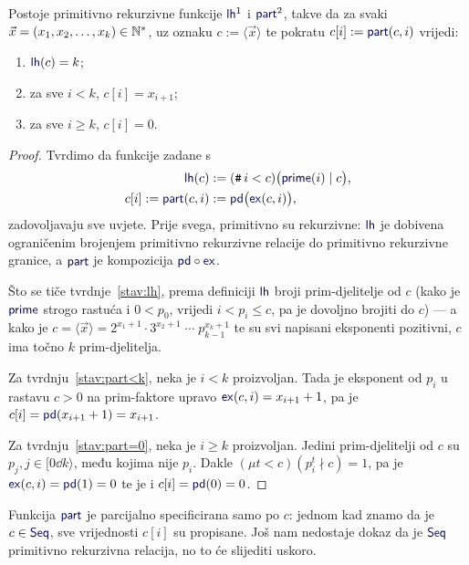 \begin{propozicija}[{name=[primitivna rekurzivnost dekodiranja konačnih nizova]}]\label{prop:lhpartprn}
Postoje primitivno rekurzivne funkcije $\f{lh}^1$ i $\f{part}^2$, takve da za svaki $\vec x=(x_1,x_2,\dotsc,x_k)\in{\mathbb N}^*$, uz oznaku $c:=\langle\vec x\rangle$ te pokratu $c[i]:=\f{part}(c,i)$ vrijedi:
\begin{enumerate}
    \item\label{stav:lh} $\f{lh}(c)=k$;
    \item\label{stav:part<k} za sve $i<k$, $c[i]=x_{i+1}$;
    \item\label{stav:part=0} za sve $i\ge k$, $c[i]=0$.
\end{enumerate}
\end{propozicija}
\begin{proof}
Tvrdimo da funkcije zadane s
\begin{align}
\f{lh}(c)&:=(\num i<c)\bigl(\f{prime}(i)\mid c\bigr)\text,\\
c[i]:=\f{part}(c,i)&:=\f{pd}\bigl(\f{ex}(c,i)\bigr)\text,
\end{align}
zadovoljavaju sve uvjete. Prije svega, primitivno su rekurzivne: $\f{lh}$ je dobivena og\-ra\-ni\-če\-nim brojenjem primitivno rekurzivne relacije do primitivno rekurzivne granice, a $\f{part}$ je kompozicija $\f{pd}\circ\f{ex}$.

    Što se tiče tvrdnje~\ref{stav:lh}, prema definiciji $\f{lh}$ broji prim-djelitelje od $c$ (kako je $\f{prime}$ strogo rastuća i $0<p_0$, vrijedi $i<p_i\le c$, pa je dovoljno brojiti do $c$) --- a kako je $c=\langle\vec x\rangle=2^{x_1+1}\cdot3^{x_2+1}\mathbin{\dotsm}p_{k-1}^{x_k+1}$ te su svi napisani eksponenti pozitivni, $c$ ima točno $k$ prim-djelitelja.

Za tvrdnju~\ref{stav:part<k}, neka je $i<k$ proizvoljan. Tada je eksponent od $p_i$ u rastavu $c>0$ na prim-faktore upravo $\f{ex}(c,i)=x_{i+1}+1$, pa je $c[i]=\f{pd}(x_{i+1}+1)=x_{i+1}$.

    Za tvrdnju~\ref{stav:part=0}, neka je $i\ge k$ proizvoljan. Jedini prim-djelitelji od $c$ su $p_j,j\in[0\dd k\rangle$, među kojima nije $p_i$. Dakle $(\mu t<c)(p_i^t\nmid c)=1$, pa je $\f{ex}(c,i)=\f{pd}(1)=0$ te je i $c[i]=\f{pd}(0)=0$.
\end{proof}

Funkcija $\f{part}$ je parcijalno specificirana samo po $c$: jednom kad znamo da je $c\in\f{Seq}$, sve vrijednosti $c[i]$ su propisane. Još nam nedostaje dokaz da je $\f{Seq}$ primitivno rekurzivna relacija, no to će slijediti uskoro.

